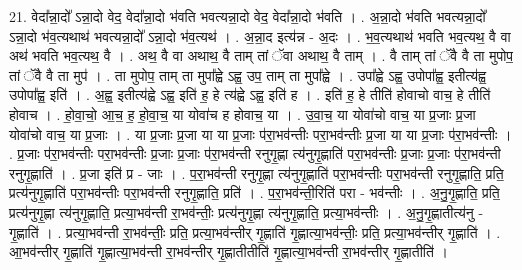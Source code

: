 \documentclass[17pt]{extarticle}
\begin{document}
21. वेदा᳚न्ना॒दो᳚ ऽन्ना॒दो वेद॒ वेदा᳚न्ना॒दो भ॑वति भवत्यन्ना॒दो वेद॒ वेदा᳚न्ना॒दो भ॑वति । . अ॒न्ना॒दो भ॑वति भवत्यन्ना॒दो᳚ ऽन्ना॒दो भ॑व॒त्यथाथ॑ भवत्यन्ना॒दो᳚ ऽन्ना॒दो भ॑व॒त्यथ॑ । . अ॒न्ना॒द इत्य॑न्न - अ॒दः । . भ॒व॒त्यथाथ॑ भवति भव॒त्यथ॒ वै वा अथ॑ भवति भव॒त्यथ॒ वै । . अथ॒ वै वा अथाथ॒ वै ताम् तां ॅवा अथाथ॒ वै ताम् । . वै ताम् तां ॅवै वै ता मुपोप॒ तां ॅवै वै ता मुप॑ । . ता मुपोप॒ ताम् ता मुपा᳚ह्वे ऽह्व॒ उप॒ ताम् ता मुपा᳚ह्वे । . उपा᳚ह्वे ऽह्व॒ उपोपा᳚ह्व॒ इतीत्य॑ह्व॒ उपोपा᳚ह्व॒ इति॑ । . अ॒ह्व॒ इतीत्य॑ह्वे ऽह्व॒ इति॑ ह॒ हे त्य॑ह्वे ऽह्व॒ इति॑ ह । . इति॑ ह॒ हे तीति॑ होवाचो वाच॒ हे तीति॑ होवाच । . हो॒वा॒चो॒ आ॒च॒ ह॒ हो॒वा॒च॒ या योवा॑च ह होवाच॒ या । . उ॒वा॒च॒ या योवा॑चो वाच॒ या प्र॒जाः प्र॒जा योवा॑चो वाच॒ या प्र॒जाः । . या प्र॒जाः प्र॒जा या या प्र॒जाः प॑रा॒भव॑न्तीः परा॒भव॑न्तीः प्र॒जा या या प्र॒जाः प॑रा॒भव॑न्तीः । . प्र॒जाः प॑रा॒भव॑न्तीः परा॒भव॑न्तीः प्र॒जाः प्र॒जाः प॑रा॒भव॑न्ती रनुगृ॒ह्णा त्य॑नुगृ॒ह्णाति॑ परा॒भव॑न्तीः प्र॒जाः प्र॒जाः प॑रा॒भव॑न्ती रनुगृ॒ह्णाति॑ । . प्र॒जा इति॑ प्र - जाः । . प॒रा॒भव॑न्ती रनुगृ॒ह्णा त्य॑नुगृ॒ह्णाति॑ परा॒भव॑न्तीः परा॒भव॑न्ती रनुगृ॒ह्णाति॒ प्रति॒ प्रत्य॑नुगृ॒ह्णाति॑ परा॒भव॑न्तीः परा॒भव॑न्ती रनुगृ॒ह्णाति॒ प्रति॑ । . प॒रा॒भव॑न्ती॒रिति॑ परा - भव॑न्तीः । . अ॒नु॒गृ॒ह्णाति॒ प्रति॒ प्रत्य॑नुगृ॒ह्णा त्य॑नुगृ॒ह्णाति॒ प्रत्या॒भव॑न्ती रा॒भव॑न्तीः॒ प्रत्य॑नुगृ॒ह्णा त्य॑नुगृ॒ह्णाति॒ प्रत्या॒भव॑न्तीः । . अ॒नु॒गृ॒ह्णातीत्य॑नु - गृ॒ह्णाति॑ । . प्रत्या॒भव॑न्ती रा॒भव॑न्तीः॒ प्रति॒ प्रत्या॒भव॑न्तीर् गृ॒ह्णाति॑ गृ॒ह्णात्या॒भव॑न्तीः॒ प्रति॒ प्रत्या॒भव॑न्तीर् गृ॒ह्णाति॑ । . आ॒भव॑न्तीर् गृ॒ह्णाति॑ गृ॒ह्णात्या॒भव॑न्ती रा॒भव॑न्तीर् गृ॒ह्णातीतीति॑ गृ॒ह्णात्या॒भव॑न्ती रा॒भव॑न्तीर् गृ॒ह्णातीति॑ । \newline
\end{document}
